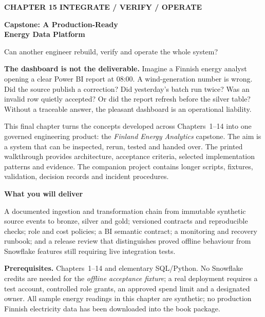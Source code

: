\documentclass[11pt,twoside]{article}
\begin{document}
{\sffamily\bfseries\fontsize{9}{11}\selectfont\color{steelblue} CHAPTER 15 \hfill INTEGRATE / VERIFY / OPERATE}\par\vspace{3mm}
{\sffamily\bfseries\fontsize{19}{22}\selectfont\color{navy} Capstone: A Production-Ready\\Energy Data Platform}\par\vspace{2mm}
{\sffamily\fontsize{11}{14}\selectfont\color{steelblue} Can another engineer rebuild, verify and operate the whole system?}\par\vspace{3mm}
\begin{insight}\textbf{The dashboard is not the deliverable.} Imagine a Finnish energy analyst opening a clear Power BI report at 08:00. A wind-generation number is wrong. Did the source publish a correction? Did yesterday's batch run twice? Was an invalid row quietly accepted? Or did the report refresh before the silver table? Without a traceable answer, the pleasant dashboard is an operational liability.\end{insight}
This final chapter turns the concepts developed across Chapters~1--14 into one governed engineering product: the \emph{Finland Energy Analytics} capstone. The aim is a system that can be inspected, rerun, tested and handed over. The printed walkthrough provides architecture, acceptance criteria, selected implementation patterns and evidence. The companion project contains longer scripts, fixtures, validation, decision records and incident procedures.
\begin{whitebox}\textbf{What you will deliver}\par
A documented ingestion and transformation chain from immutable synthetic source events to bronze, silver and gold; versioned contracts and reproducible checks; role and cost policies; a BI semantic contract; a monitoring and recovery runbook; and a release review that distinguishes proved offline behaviour from Snowflake features still requiring live integration tests.\end{whitebox}
\textbf{Prerequisites.} Chapters~1--14 and elementary SQL/Python. No Snowflake credits are needed for the \emph{offline acceptance fixture}; a real deployment requires a test account, controlled role grants, an approved spend limit and a designated owner. All sample energy readings in this chapter are synthetic; no production Finnish electricity data has been downloaded into the book package.
\end{document}
